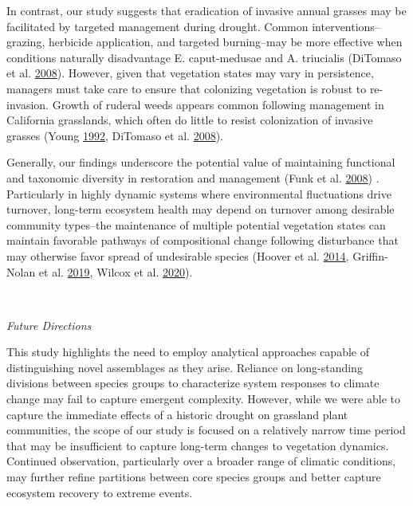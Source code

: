 \documentclass[twoside,12pt,final]{ucthesis-CA2012}
\begin{document}
\begin{ucmainmatter}
In contrast, our study suggests that eradication of invasive annual grasses may be facilitated by targeted management during drought.
Common interventions--grazing, herbicide application, and targeted burning--may be more effective when conditions naturally disadvantage E. caput-medusae and A. triucialis (DiTomaso et al. \protect\hyperlink{ref-DiTomaso2008}{2008}).
However, given that vegetation states may vary in persistence, managers must take care to ensure that colonizing vegetation is robust to re-invasion.
Growth of ruderal weeds appears common following management in California grasslands, which often do little to resist colonization of invasive grasses (Young \protect\hyperlink{ref-Young1992}{1992}, DiTomaso et al. \protect\hyperlink{ref-DiTomaso2008}{2008}).

Generally, our findings underscore the potential value of maintaining functional and taxonomic diversity in restoration and management (Funk et al. \protect\hyperlink{ref-Funk2008}{2008}) .
Particularly in highly dynamic systems where environmental fluctuations drive turnover, long-term ecosystem health may depend on turnover among desirable community types--the maintenance of multiple potential vegetation states can maintain favorable pathways of compositional change following disturbance that may otherwise favor spread of undesirable species (Hoover et al. \protect\hyperlink{ref-Hoover2014}{2014}, Griffin-Nolan et al. \protect\hyperlink{ref-Griffin-Nolan2019}{2019}, Wilcox et al. \protect\hyperlink{ref-Wilcox2020}{2020}).

~

\emph{Future Directions}

This study highlights the need to employ analytical approaches capable of distinguishing novel assemblages as they arise.
Reliance on long-standing divisions between species groups to characterize system responses to climate change may fail to capture emergent complexity.
However, while we were able to capture the immediate effects of a historic drought on grassland plant communities, the scope of our study is focused on a relatively narrow time period that may be insufficient to capture long-term changes to vegetation dynamics.
Continued observation, particularly over a broader range of climatic conditions, may further refine partitions between core species groups and better capture ecosystem recovery to extreme events.

\appendix

\hypertarget{chapter-1-supporting-information}{%
}
\end{ucmainmatter}
\end{document}

